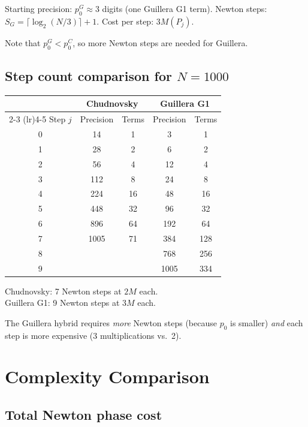 \documentclass[11pt]{article}
\begin{document}
Starting precision: $p_0^G \approx 3$ digits (one Guillera G1 term). Newton steps: $S_G = \lceil \log_2(N/3) \rceil + 1$. Cost per step: $3M(P_j)$.

Note that $p_0^G < p_0^C$, so more Newton steps are needed for Guillera.

\subsection{Step count comparison for $N = 1000$}

\begin{center}
\begin{tabular}{ccccc}
\toprule
& \multicolumn{2}{c}{\textbf{Chudnovsky}} & \multicolumn{2}{c}{\textbf{Guillera G1}} \\
\cmidrule(lr){2-3} \cmidrule(lr){4-5}
Step $j$ & Precision & Terms & Precision & Terms \\
\midrule
0 & 14 & 1 & 3 & 1 \\
1 & 28 & 2 & 6 & 2 \\
2 & 56 & 4 & 12 & 4 \\
3 & 112 & 8 & 24 & 8 \\
4 & 224 & 16 & 48 & 16 \\
5 & 448 & 32 & 96 & 32 \\
6 & 896 & 64 & 192 & 64 \\
7 & 1005 & 71 & 384 & 128 \\
8 & & & 768 & 256 \\
9 & & & 1005 & 334 \\
\bottomrule
\end{tabular}
\end{center}

Chudnovsky: 7 Newton steps at $2M$ each.\\
Guillera G1: 9 Newton steps at $3M$ each.

The Guillera hybrid requires \emph{more} Newton steps (because $p_0$ is smaller) \emph{and} each step is more expensive (3 multiplications vs.\ 2).

\section{Complexity Comparison}
\label{sec:complexity}

\subsection{Total Newton phase cost}
\end{document}
